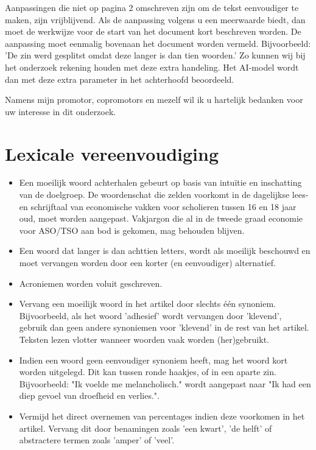 \documentclass{report}
\begin{document}
	\medspace
	
	Aanpassingen die niet op pagina 2 omschreven zijn om de tekst eenvoudiger te maken, zijn vrijblijvend. Als de aanpassing volgens u een meerwaarde biedt, dan moet de werkwijze voor de start van het document kort beschreven worden. De aanpassing moet eenmalig bovenaan het document worden vermeld. Bijvoorbeeld: 'De zin werd gesplitst omdat deze langer is dan tien woorden.' Zo kunnen wij bij het onderzoek rekening houden met deze extra handeling. Het AI-model wordt dan met deze extra parameter in het achterhoofd beoordeeld.
	
	\medspace
	
	Namens mijn promotor, copromotors en mezelf wil ik u hartelijk bedanken voor uw interesse in dit onderzoek.
	
	\newpage
	
	\section{Lexicale vereenvoudiging}
	
	\begin{itemize}
		\item Een moeilijk woord achterhalen gebeurt op basis van intuïtie en inschatting van de doelgroep. De woordenschat die zelden voorkomt in de dagelijkse lees- en schrijftaal van economische vakken voor scholieren tussen 16 en 18 jaar oud, moet worden aangepast. Vakjargon die al in de tweede graad economie voor ASO/TSO aan bod is gekomen, mag behouden blijven.
		\item Een woord dat langer is dan achttien letters, wordt als moeilijk beschouwd en moet vervangen worden door een korter (en eenvoudiger) alternatief.
		\item Acroniemen worden voluit geschreven.
		\item Vervang een moeilijk woord in het artikel door slechts één synoniem. Bijvoorbeeld, als het woord 'adhesief' wordt vervangen door 'klevend', gebruik dan geen andere synoniemen voor 'klevend' in de rest van het artikel. Teksten lezen vlotter wanneer woorden vaak worden (her)gebruikt.
		\item Indien een woord geen eenvoudiger synoniem heeft, mag het woord kort worden uitgelegd. Dit kan tussen ronde haakjes, of in een aparte zin. Bijvoorbeeld: "Ik voelde me melancholisch." wordt aangepast naar "Ik had een diep gevoel van droefheid en verlies.".		
		\item Vermijd het direct overnemen van percentages indien deze voorkomen in het artikel. Vervang dit door benamingen zoals 'een kwart', 'de helft' of abstractere termen zoals 'amper' of 'veel'. 
	\end{itemize}
	
\end{document}
